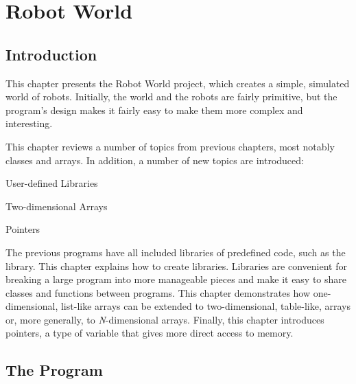 \chapter{Robot World}

\section{Introduction}

This chapter presents the Robot World project, which creates a simple, simulated world of robots.  Initially, the world and the robots are fairly primitive, but the program's design makes it fairly easy to make them more complex and interesting.

This chapter reviews a number of topics from  previous chapters, most notably classes and arrays.  In addition, a number of new topics are introduced:
\begin{tight_itemize}
  \item User-defined Libraries
  \item Two-dimensional Arrays
  \item Pointers
\end{tight_itemize}

The previous programs have all included libraries of predefined code, such as the  library.  This chapter explains how to create libraries.  Libraries are convenient for breaking a large program into more manageable pieces and make it easy to share classes and functions between programs.   This chapter demonstrates how one-dimensional, list-like arrays can be extended to two-dimensional, table-like, arrays or, more generally, to \emph{N}-dimensional arrays.  Finally, this chapter introduces pointers, a type of variable that gives more direct access to memory.

\section{The Program}

